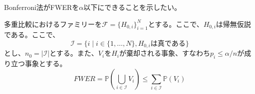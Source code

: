 \documentclass[12pt]{jarticle}
\numberwithin{equation}{section}    %
\numberwithin{figure}{section}      %
\numberwithin{table}{section}      %
\begin{document}
Bonferroni法がFWERを$\alpha$以下にできることを示したい。

多重比較におけるファミリーを$\mathcal{F} = \{H_{0, i}\}_{i = 1}^{N}$とする。ここで、$H_{0, i}$は帰無仮説である。ここで、
\begin{equation}
    \mathcal{I} = \{i \mid i \in \{1, \ldots, N\}, H_{0, i}は真である\}
\end{equation}
とし、$n_{0} = |\mathcal{I}|$とする。また、$V_{i}$を$H_{i}$が棄却される事象、すなわち$p_{i} \le \alpha / n$が成り立つ事象とする。
\begin{equation}
    FWER = \mathbb{P}\left(\bigcup_{i \in \mathcal{I}} V_{i}\right) \le \sum_{i \in \mathcal{I}} \mathbb{P}(V_{i})
\end{equation}
\end{document}
